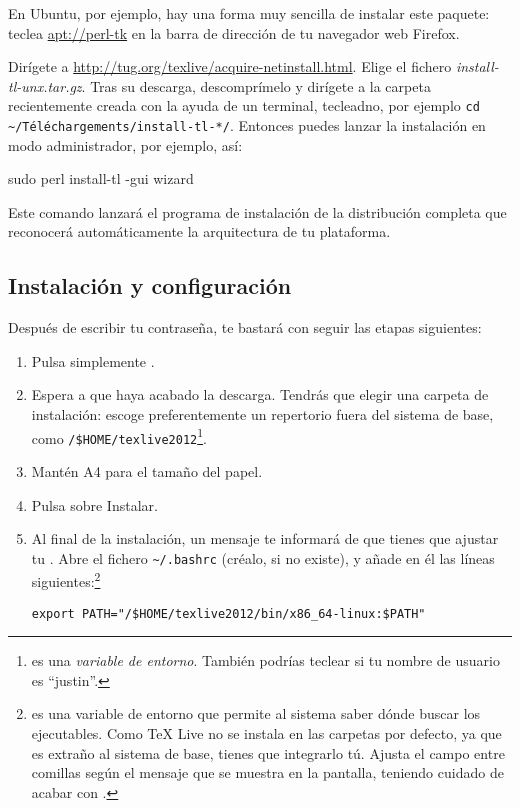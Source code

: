 En Ubuntu, por ejemplo, hay una forma muy sencilla de instalar este paquete: teclea \url{apt://perl-tk} en la barra de dirección de tu navegador web Firefox.

Dirígete a \url{http://tug.org/texlive/acquire-netinstall.html}. Elige el fichero \emph{install-tl-unx.tar.gz}. Tras su descarga, descomprímelo y dirígete a la carpeta recientemente creada con la ayuda de un terminal, tecleadno, por ejemplo \verb|cd ~/Téléchargements/install-tl-*/|. Entonces puedes lanzar la instalación en modo administrador, por ejemplo, así:

\begin{bashcode}
sudo perl install-tl -gui wizard
\end{bashcode}
Este comando lanzará el programa de instalación de la distribución completa que reconocerá automáticamente la arquitectura de tu plataforma.

\subsection{Instalación y configuración}

Después de escribir tu contraseña, te bastará con seguir las etapas siguientes:

\begin{enumerate}
\item Pulsa simplemente .
\item Espera a que haya acabado la descarga. Tendrás que elegir una carpeta de instalación: escoge preferentemente un repertorio fuera del sistema de base, como \verb|/$HOME/texlive2012|\footnote{ es una \emph{variable de entorno}. También podrías teclear  si tu nombre de usuario es \enquote{justin}.}.
\item Mantén A4 para el tamaño del papel.
\item Pulsa sobre Instalar.
\item Al final de la instalación, un mensaje te informará de que tienes que ajustar tu . Abre el fichero \verb|~/.bashrc| (créalo, si no existe), y añade en él las líneas siguientes:\footnote{ es una variable de entorno que permite al sistema saber dónde buscar los ejecutables. Como TeX Live no se instala en las carpetas por defecto, ya que es extraño al sistema de base, tienes que integrarlo tú. Ajusta el campo entre comillas según el mensaje que se muestra en la pantalla, teniendo cuidado de acabar con .}\\
  \begin{english}\verb|export PATH="/$HOME/texlive2012/bin/x86_64-linux:$PATH"|\end{english}
\end{enumerate}

